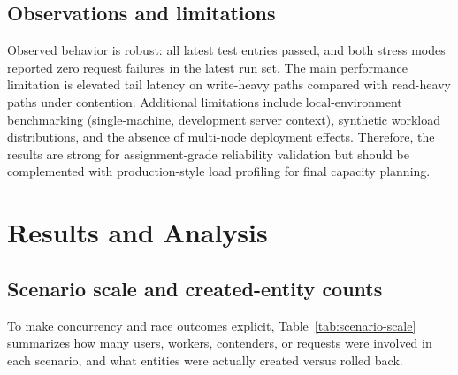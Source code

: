 \documentclass[a4paper, 11pt]{article}
\begin{document}
\subsection{Observations and limitations}
Observed behavior is robust: all latest test entries passed, and both stress modes reported zero request failures in the latest run set. The main performance limitation is elevated tail latency on write-heavy paths compared with read-heavy paths under contention. Additional limitations include local-environment benchmarking (single-machine, development server context), synthetic workload distributions, and the absence of multi-node deployment effects. Therefore, the results are strong for assignment-grade reliability validation but should be complemented with production-style load profiling for final capacity planning.

\section{Results and Analysis}

\subsection{Scenario scale and created-entity counts}
To make concurrency and race outcomes explicit, Table~\ref{tab:scenario-scale} summarizes how many users, workers, contenders, or requests were involved in each scenario, and what entities were actually created versus rolled back.
\end{document}
